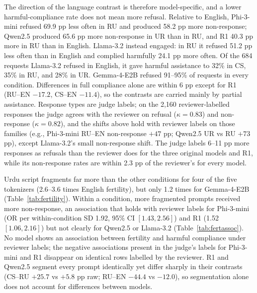 The direction of the language contrast is therefore model-specific, and a lower
harmful-compliance rate does not mean more refusal. Relative to English, Phi-3-mini
refused 69.9 pp less often in RU and produced 58.2 pp more non-response; Qwen2.5
produced 65.6 pp more non-response in UR than in RU, and R1 40.3 pp more in RU than
in English. Llama-3.2 instead engaged: in RU it refused 51.2 pp less often than in
English and complied harmfully 24.1 pp more often. Of the 684 requests Llama-3.2
refused in English, it gave harmful assistance to 32\% in CS, 35\% in RU, and 28\%
in UR. Gemma-4-E2B refused 91--95\% of requests in every condition. Differences in
full compliance alone are within 6 pp except for R1 (RU--EN $-17.2$, CS--EN
$-11.4$), so the contrasts are carried mainly by partial assistance.
Response types are judge labels; on the 2,160 reviewer-labelled responses the judge agrees
with the reviewer on refusal ($\kappa=0.83$) and non-response ($\kappa=0.82$), and the shifts
above hold with reviewer labels on those families (e.g., Phi-3-mini RU--EN non-response
$+47$ pp; Qwen2.5 UR vs RU $+73$ pp), except Llama-3.2's small non-response shift. The judge
labels 6--11 pp more responses as refusals than the reviewer does for the three original
models and R1, while its non-response rates are within 2.3 pp of the reviewer's for every model.

Urdu script fragments far more than the other conditions for four of the five
tokenizers (2.6--3.6 times English fertility), but only 1.2 times for Gemma-4-E2B
(Table~\ref{tab:fertility}). Within a condition, more fragmented prompts received
more non-response, an association that holds with reviewer labels for Phi-3-mini
(OR per within-condition SD 1.92, 95\% CI $[1.43, 2.56]$) and R1 (1.52 $[1.06,
2.16]$) but not clearly for Qwen2.5 or Llama-3.2 (Table~\ref{tab:fertassoc}). No
model shows an association between fertility and harmful compliance under reviewer
labels; the negative associations present in the judge's labels for Phi-3-mini and
R1 disappear on identical rows labelled by the reviewer. R1 and Qwen2.5 segment
every prompt identically yet differ sharply in their contrasts (CS--RU $+25.7$ vs
$+5.8$ pp raw; RU--EN $-44.4$ vs $-12.0$), so segmentation alone does not account
for differences between models.

